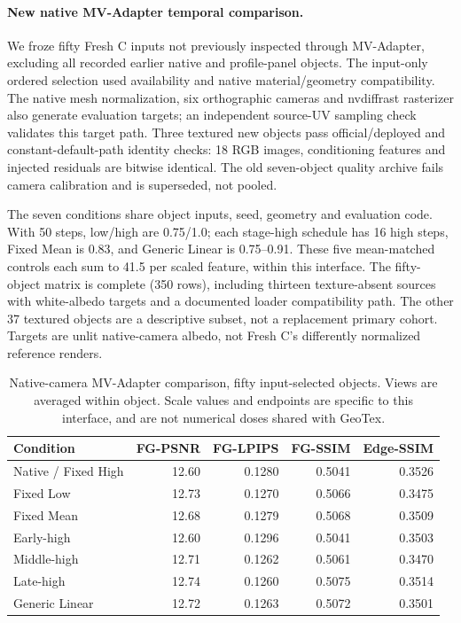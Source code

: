 \documentclass[times,twocolumn,final]{elsarticle}
\begin{document}
\paragraph{New native MV-Adapter temporal comparison.}
\label{subsec:new-mva}
We froze fifty Fresh C inputs not previously inspected through MV-Adapter, excluding all recorded earlier native and profile-panel objects. The input-only ordered selection used availability and native material/geometry compatibility. The native mesh normalization, six orthographic cameras and nvdiffrast rasterizer also generate evaluation targets; an independent source-UV sampling check validates this target path. Three textured new objects pass official/deployed and constant-default-path identity checks: 18 RGB images, conditioning features and injected residuals are bitwise identical. The old seven-object quality archive fails camera calibration and is superseded, not pooled.

The seven conditions share object inputs, seed, geometry and evaluation code. With 50 steps, low/high are 0.75/1.0; each stage-high schedule has 16 high steps, Fixed Mean is 0.83, and Generic Linear is 0.75--0.91. These five mean-matched controls each sum to 41.5 per scaled feature, within this interface. The fifty-object matrix is complete (350 rows), including thirteen texture-absent sources with white-albedo targets and a documented loader compatibility path. The other 37 textured objects are a descriptive subset, not a replacement primary cohort. Targets are unlit native-camera albedo, not Fresh C's differently normalized reference renders.

\begin{table}[ht]\centering\scriptsize
\caption{Native-camera MV-Adapter comparison, fifty input-selected objects. Views are averaged within object. Scale values and endpoints are specific to this interface, and are not numerical doses shared with GeoTex.}\label{tab:new-mva}
\begin{tabular}{lrrrr}
\toprule Condition & FG-PSNR & FG-LPIPS & FG-SSIM & Edge-SSIM \\
\midrule
Native / Fixed High & 12.60 & 0.1280 & 0.5041 & 0.3526 \\
Fixed Low & 12.73 & 0.1270 & 0.5066 & 0.3475 \\
Fixed Mean & 12.68 & 0.1279 & 0.5068 & 0.3509 \\
Early-high & 12.60 & 0.1296 & 0.5041 & 0.3503 \\
Middle-high & 12.71 & 0.1262 & 0.5061 & 0.3470 \\
Late-high & 12.74 & 0.1260 & 0.5075 & 0.3514 \\
Generic Linear & 12.72 & 0.1263 & 0.5072 & 0.3501 \\
\bottomrule\end{tabular}\end{table}
\end{document}
